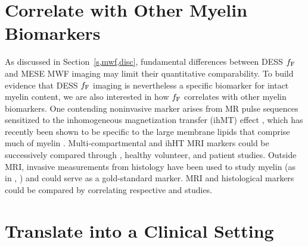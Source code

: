 \section{Correlate with Other Myelin Biomarkers}
\label{s,future,myelin}

As discussed in Section~\ref{s,mwf,disc},
fundamental differences 
between DESS $f_{\mathrm{F}}$ and MESE MWF imaging
may limit their quantitative comparability.
To build evidence 
that DESS $f_{\mathrm{F}}$ imaging
is nevertheless a specific biomarker
for intact myelin content,
we are also interested 
in how $f_{\mathrm{F}}$ correlates 
with other myelin biomarkers.
One contending noninvasive marker arises
from MR pulse sequences sensitized
to the inhomogeneous magnetization transfer (ihMT) effect
\cite{varma:15:mtf},
which has recently been shown
to be specific
to the large membrane lipids
that comprise much of myelin
\cite{varma:15:iom, swanson:17:mda}.
Multi-compartmental and ihHT MRI markers 
could be successively compared 
through \exvivo, healthy volunteer, and patient studies.
Outside MRI,
invasive measurements
from histology
have been used to study myelin 
(as in \eg, \cite{gareau:00:mta, webb:03:imt})
and could serve as a gold-standard \insitu marker.
MRI and histological markers
could be compared 
by correlating respective \exvivo and \insitu studies.

\section{Translate into a Clinical Setting}
\label{s,future,clinic}

